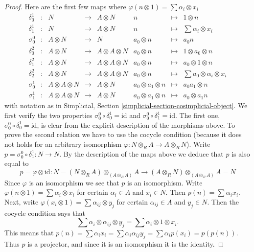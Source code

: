 \begin{proof}
Here are the first few maps
where $\varphi(n \otimes 1) = \sum \alpha_i \otimes x_i$
$$
\begin{matrix}
\delta^1_0 & : & N & \to & A \otimes N & n & \mapsto & 1 \otimes n \\
\delta^1_1 & : & N & \to & A \otimes N & n & \mapsto &
\sum \alpha_i \otimes x_i\\
\sigma^0_0 & : & A \otimes N & \to & N & a_0 \otimes n & \mapsto & a_0n \\
\delta^2_0 & : & A \otimes N & \to & A \otimes A \otimes N &
a_0 \otimes n & \mapsto & 1 \otimes a_0 \otimes n \\
\delta^2_1 & : & A \otimes N & \to & A \otimes A \otimes N &
a_0 \otimes n & \mapsto & a_0 \otimes 1 \otimes n \\
\delta^2_2 & : & A \otimes N & \to & A \otimes A \otimes N &
a_0 \otimes n & \mapsto & \sum a_0 \otimes \alpha_i \otimes x_i \\
\sigma^1_0 & : & A \otimes A \otimes N & \to & A \otimes N &
a_0 \otimes a_1 \otimes n & \mapsto & a_0a_1 \otimes n \\
\sigma^1_1 & : & A \otimes A \otimes N & \to & A \otimes N &
a_0 \otimes a_1 \otimes n & \mapsto & a_0 \otimes a_1n
\end{matrix}
$$
with notation as in
Simplicial, Section \ref{simplicial-section-cosimplicial-object}.
We first verify the two properties $\sigma^0_0 \circ \delta^1_0 = \text{id}$
and $\sigma^0_0 \circ \delta^1_1 = \text{id}$.
The first one, $\sigma^0_0 \circ \delta^1_0 = \text{id}$, is clear from
the explicit description of the morphisms above.
To prove the second relation we have to use the cocycle condition
(because it does not holds for an arbitrary isomorphism
$\varphi : N \otimes_R A \to A \otimes_R N$). Write
$p = \sigma^0_0 \circ \delta^1_1 : N \to N$. By the description of the
maps above we deduce that $p$ is also equal to
$$
p = \varphi \otimes \text{id} :
N = (N \otimes_R A) \otimes_{(A \otimes_R A)} A
\longrightarrow
(A \otimes_R N) \otimes_{(A \otimes_R A)} A = N
$$
Since $\varphi$ is an isomorphism we see that $p$ is an isomorphism.
Write $\varphi(n \otimes 1) = \sum \alpha_i \otimes x_i$ for certain
$\alpha_i \in A$ and $x_i \in N$. Then $p(n) = \sum \alpha_ix_i$.
Next, write
$\varphi(x_i \otimes 1) = \sum \alpha_{ij} \otimes y_j$ for
certain $\alpha_{ij} \in A$ and $y_j \in N$. Then the cocycle condition
says that
$$
\sum \alpha_i \otimes \alpha_{ij} \otimes y_j
=
\sum \alpha_i \otimes 1 \otimes x_i.
$$
This means that $p(n) = \sum \alpha_ix_i = \sum \alpha_i\alpha_{ij}y_j =
\sum \alpha_i p(x_i) = p(p(n))$. Thus $p$ is a projector, and since it is
an isomorphism it is the identity.


\end{proof}
